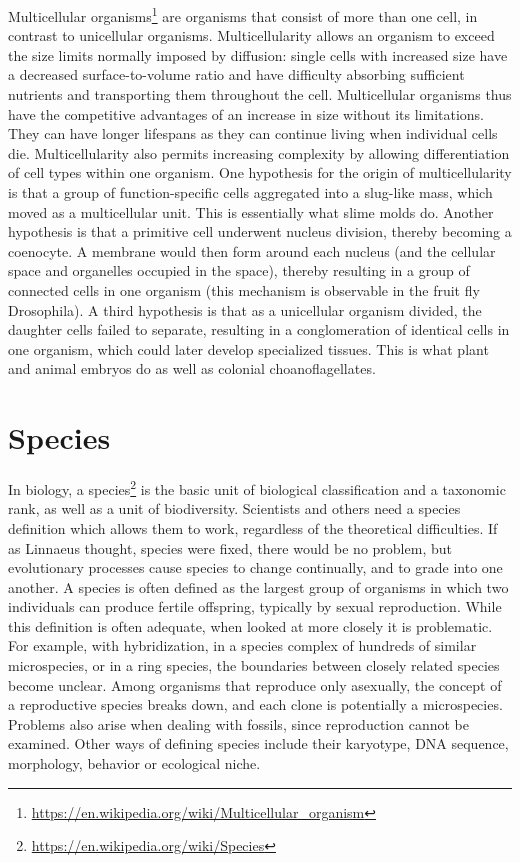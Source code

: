 \documentclass[]{book}
\let\rmarkdownfootnote\footnote%
\def\footnote{\protect\rmarkdownfootnote}
\renewcommand{\href}[2]{#2\footnote{\url{#1}}}
\begin{document}
\href{https://en.wikipedia.org/wiki/Multicellular_organism}{Multicellular organisms} are organisms that consist of more than one cell, in contrast to unicellular organisms. Multicellularity allows an organism to exceed the size limits normally imposed by diffusion: single cells with increased size have a decreased surface-to-volume ratio and have difficulty absorbing sufficient nutrients and transporting them throughout the cell. Multicellular organisms thus have the competitive advantages of an increase in size without its limitations. They can have longer lifespans as they can continue living when individual cells die. Multicellularity also permits increasing complexity by allowing differentiation of cell types within one organism.
One hypothesis for the origin of multicellularity is that a group of function-specific cells aggregated into a slug-like mass, which moved as a multicellular unit. This is essentially what slime molds do. Another hypothesis is that a primitive cell underwent nucleus division, thereby becoming a coenocyte. A membrane would then form around each nucleus (and the cellular space and organelles occupied in the space), thereby resulting in a group of connected cells in one organism (this mechanism is observable in the fruit fly Drosophila). A third hypothesis is that as a unicellular organism divided, the daughter cells failed to separate, resulting in a conglomeration of identical cells in one organism, which could later develop specialized tissues. This is what plant and animal embryos do as well as colonial choanoflagellates.

\hypertarget{species}{%
\section{Species}\label{species}}

In biology, a \href{https://en.wikipedia.org/wiki/Species}{species} is the basic unit of biological classification and a taxonomic rank, as well as a unit of biodiversity. Scientists and others need a species definition which allows them to work, regardless of the theoretical difficulties. If as Linnaeus thought, species were fixed, there would be no problem, but evolutionary processes cause species to change continually, and to grade into one another. A species is often defined as the largest group of organisms in which two individuals can produce fertile offspring, typically by sexual reproduction. While this definition is often adequate, when looked at more closely it is problematic. For example, with hybridization, in a species complex of hundreds of similar microspecies, or in a ring species, the boundaries between closely related species become unclear. Among organisms that reproduce only asexually, the concept of a reproductive species breaks down, and each clone is potentially a microspecies. Problems also arise when dealing with fossils, since reproduction cannot be examined. Other ways of defining species include their karyotype, DNA sequence, morphology, behavior or ecological niche.
\end{document}
